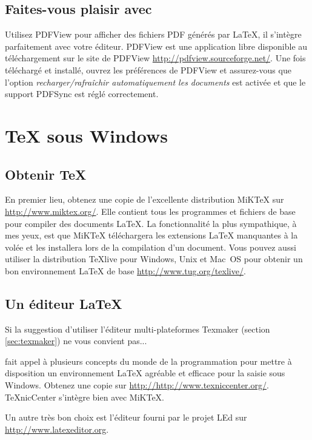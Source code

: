 \subsection{Faites-vous plaisir avec }

Utilisez PDFView pour afficher des fichiers PDF générés par \LaTeX{},
il s'intègre parfaitement avec votre éditeur. PDFView est une
application libre disponible au téléchargement sur le site de PDFView
\url{http://pdfview.sourceforge.net/}. Une fois téléchargé et
installé, ouvrez les préférences de PDFView et assurez-vous que
l'option \emph{recharger/rafraîchir automatiquement les documents} est
activée et que le support PDFSync est réglé correctement.

\section{\TeX{} sous Windows}

\subsection{Obtenir \TeX{}}

En premier lieu, obtenez une copie de l'excellente distribution
MiK\TeX{} sur \url{http://www.miktex.org/}. Elle contient tous les
programmes et fichiers de base pour compiler des documents
\LaTeX{}. La fonctionnalité la plus sympathique, à mes yeux, est que
MiK\TeX{} téléchargera les extensions \LaTeX{} manquantes à la volée et
les installera lors de la compilation d'un document. Vous pouvez aussi
utiliser la distribution TeXlive pour Windows, Unix et Mac~OS pour
obtenir un bon environnement \LaTeX{} de base
\url{http://www.tug.org/texlive/}.

\subsection{Un éditeur \LaTeX{}}

Si la suggestion d'utiliser l'éditeur multi-plateformes Texmaker
(section \ref{sec:texmaker}) ne vous convient pas...

 fait appel à plusieurs concepts du monde
de la programmation pour mettre à disposition un environnement
\LaTeX{} agréable et efficace pour la saisie sous Windows. Obtenez une
copie sur \url{http://http://www.texniccenter.org/}. TeXnicCenter s'intègre
bien avec MiKTeX.

Un autre très bon choix est l'éditeur fourni par le projet LEd sur
\url{http://www.latexeditor.org}.

